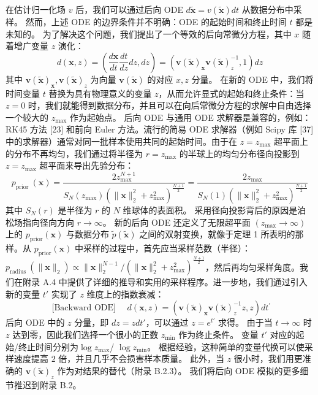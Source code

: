 \documentclass[hyperref,UTF-8]{ctexart}
\newcommand{\0}{\boldsymbol{0}}
\begin{document}
在估计归一化场 $v$ 后，我们可以通过后向 ODE $d\tilde{\mathbf{x}} = v(\tilde{\mathbf{x}})dt$ 从数据分布中采样。 然而，上述 ODE 的边界条件并不明确：ODE 的起始时间和终止时间 $t$ 都是未知的。 为了解决这个问题，我们提出了一个等效的后向常微分方程，其中 $x$ 随着增广变量 $z$ 演化：
\[
  d(\mathbf{x}, z)=\left(\frac{d \mathbf{x}}{d t} \frac{d t}{d z} d z, d z\right)=\left(\mathbf{v}(\tilde{\mathbf{x}})_{\mathbf{x}} \mathbf{v}(\tilde{\mathbf{x}})_z^{-1}, 1\right) d z
\]
其中 $\mathbf{v}(\tilde{\mathbf{x}})_{\mathbf{x}}, \mathbf{v}(\tilde{\mathbf{x}})_z$ 为向量 $\mathbf{v}(\tilde{\mathbf{x}})$ 的对应 $x,z$ 分量。 在新的 ODE 中，我们将时间变量 $t$ 替换为具有物理意义的变量 $z$，从而允许显式的起始和终止条件：当 $z = 0$ 时，我们就能得到数据分布，并且可以在向后常微分方程的求解中自由选择一个较大的 $z_{\text{max}}$ 作为起始点。 后向 ODE 与通用 ODE 求解器是兼容的，例如：RK45 方法 [23] 和前向 Euler 方法。流行的简易 ODE 求解器（例如 Scipy 库 [37] 中的求解器）通常对同一批样本使用共同的起始时间。由于在 $z = z_{\text{max}}$ 超平面上的分布不再均匀，我们通过将半径为 $r = z_{\text{max}}$ 的半球上的均匀分布径向投影到 $z = z_{\text{max}}$ 超平面来导出先验分布：
\[
  p_{\text {prior }}(\mathbf{x})=\frac{2 z_{\max }^{N+1}}{S_N\left(z_{\max }\right)\left(\|\mathbf{x}\|_2^2+z_{\max }^2\right)^{\frac{N+1}{2}}}=\frac{2 z_{\max }}{S_N(1)\left(\|\mathbf{x}\|_2^2+z_{\max }^2\right)^{\frac{N+1}{2}}}
\]
其中 $S_N (r)$ 是半径为 $r$ 的 $N$ 维球体的表面积。 采用径向投影背后的原因是泊松场指向径向方向 $r \rightarrow \infty$。 新的后向 ODE 还定义了无限超平面 $(z_{\text{max}} \rightarrow \infty)$ 上的 $p_{\text{prior}}(\mathbf{x})$ 与数据分布 $\tilde{p}(\tilde{\mathbf{x}})$ 之间的双射变换，就像于定理 1 所表明的那样。从 $p_{\text{prior}}(\mathbf{x})$ 中采样的过程中，首先应当采样范数（半径）：$p_{\text {radius }}\left(\|\mathbf{x}\|_2\right) \propto\|\mathbf{x}\|_2^{N-1} /\left(\|\mathbf{x}\|_2^2+z_{\max }^2\right)^{\frac{N+1}{2}}$，然后再均匀采样角度。我们在附录 A.4 中提供了详细的推导和实用的采样程序。进一步地，我们通过引入新的变量 $t'$ 实现了 $z$ 维度上的指数衰减：
\[
  \text { [Backward ODE] } \quad d(\mathbf{x}, z)=\left(\mathbf{v}(\tilde{\mathbf{x}})_{\mathbf{x}} \mathbf{v}(\tilde{\mathbf{x}})_z^{-1} z, z\right) d t^{\prime}
\]
后向 ODE 中的 $z$ 分量，即 $dz = zdt'$，可以通过 $z = e^{t'}$ 求得。 由于当 $t \rightarrow \infty$ 时 $z$ 达到零，因此我们选择一个很小的正数 $z_{\text{min}}$ 作为终止条件。 变量 $t'$ 对应的起始/终止时间分别为$\log z_{\text{max}}$/ $\log z_{\text{min}}$。 根据经验，这种简单的变量代换可以使采样速度提高 $2$ 倍，并且几乎不会损害样本质量。 此外，当 $z$ 很小时，我们用更准确的 $\mathbf{v}(\tilde{\mathbf{x}})_z$ 作为对结果的替代（附录 B.2.3）。 我们将后向 ODE 模拟的更多细节推迟到附录 B.2。
\end{document}

